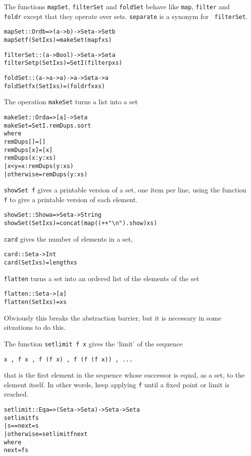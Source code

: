 \documentclass[11pt]{article}
\begin{document}
The functions {\tt mapSet}, {\tt filterSet} and {\tt foldSet}
behave like {\tt map}, {\tt filter} and {\tt foldr}
except that they operate over sets. {\tt separate} is a synonym for {\tt
filterSet}. 
\begin{alltt}
mapSet :: Ord b => (a -> b) -> Set a -> Set b
mapSet f (SetI xs) = makeSet (map f xs)

filterSet :: (a -> Bool) -> Set a -> Set a
filterSet p (SetI xs) = SetI (filter p xs)

foldSet :: (a -> a -> a) -> a -> Set a -> a
foldSet f x (SetI xs)  = (foldr f x xs)
\end{alltt}
The operation {\tt makeSet} turns a list into a set
\begin{alltt}
makeSet :: Ord a => [a] -> Set a
makeSet = SetI . remDups . sort
          where
          remDups []      = []
          remDups [x]     = [x]
          remDups (x:y:xs) 
            | x < y       = x : remDups (y:xs)
            | otherwise   = remDups (y:xs)
\end{alltt}
{\tt showSet f} gives a printable version of a set, one item per line,
using the function {\tt f} to give a printable version of each element.
\begin{alltt}
showSet :: Show a => Set a -> String
showSet (SetI xs) = concat (map ((++"\verb+\+n") . show) xs)
\end{alltt}
{\tt card} gives the number of elements in a set,
\begin{alltt}
card :: Set a -> Int
card (SetI xs) = length xs
\end{alltt}
{\tt flatten} turns a set into an ordered list of the elements of
the set
\begin{alltt}
flatten :: Set a -> [a]
flatten (SetI xs) = xs
\end{alltt}
Obviously this breaks the abstraction 
barrier, but it is necessary in some
situations to do this.

The function {\tt setlimit f x} gives the `limit' of the sequence
\begin{center}
{\tt x , f x , f (f x) , f (f (f x)) , ...}
\end{center}
that is the first element in the sequence whose successor is equal, as a set,
to the element itself. In other words, keep applying {\tt f} until a fixed
point or limit is reached.
\begin{alltt}
setlimit :: Eq a => (Set a -> Set a) -> Set a -> Set a
setlimit f s
  | s==next      = s
  | otherwise    = setlimit f next
    where
    next = f s
\end{alltt}
\end{document}
